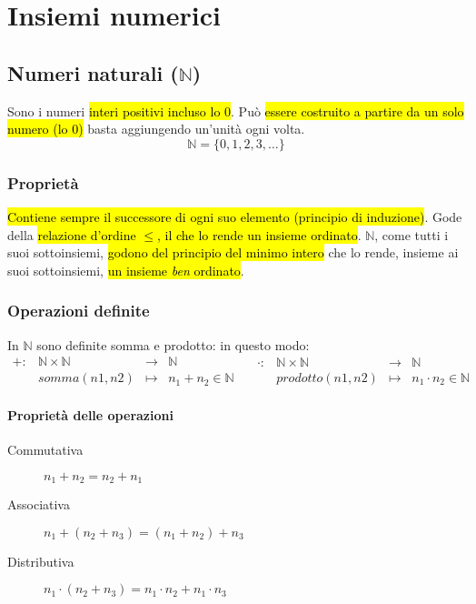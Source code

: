 \section{Insiemi numerici}
\subsection{Numeri naturali ($\mathbb{N}$)}
Sono i numeri \hl{interi positivi incluso lo 0}. Può \hl{essere costruito a 
partire da un solo numero (lo 0)} basta aggiungendo un'unità ogni volta.
\[ \mathbb{N} = \{0, 1, 2, 3, \dots \} \]

\subsubsection{Proprietà} 
\hl{Contiene sempre il successore di ogni suo elemento 
(principio di induzione)}. Gode della \hl{relazione d'ordine $\leq$, il che lo 
rende un insieme ordinato}. $\mathbb{N}$, come tutti i suoi sottoinsiemi, 
\hl{godono del principio del minimo intero} che lo rende, insieme ai suoi 
sottoinsiemi, \hl{un insieme \textit{ben} ordinato}.

\subsubsection{Operazioni definite} 
In $\mathbb{N}$ sono definite somma e prodotto: in questo modo:\[
    \begin{array}{cccc}
        +: &\mathbb{N} \times \mathbb{N} &\to &\mathbb{N} \\
        &somma(n1, n2) &\mapsto & n_1 + n_2 \in \mathbb{N}
    \end{array} \quad
    \begin{array}{cccc}
        \cdot: &\mathbb{N} \times \mathbb{N} &\to &\mathbb{N} \\
        &prodotto(n1, n2) &\mapsto & n_1 \cdot n_2 \in \mathbb{N}
    \end{array}
\]

\paragraph{Proprietà delle operazioni}
\begin{description}
    \item[Commutativa] $n_1 + n_2 = n_2 + n_1$
    \item[Associativa] $n_1 + (n_2 + n_3) = (n_1 + n_2) + n_3$
    \item[Distributiva] $n_1 \cdot (n_2 + n_3) = n_1 \cdot n_2 + n_1 \cdot n_3$
\end{description}


